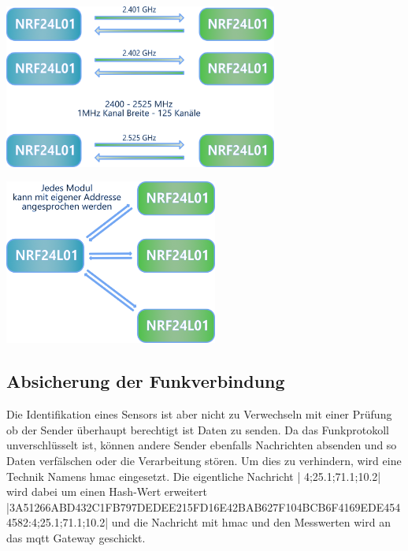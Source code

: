 \documentclass[
  12pt, %
  a4paper, %
  oneside, %
  openany, 
  numbers=noenddot, %
  BCOR=5mm, %
  parskip=half*, %
  thesis, %
]{bfhbook}
\begin{document}
\begin{center}
    \begin{minipage}[b]{0.45\textwidth}
        \centering
        \includegraphics[width=9cm]{Bilder/NRF24Kommunikation.png}
        \captionsetup{justification=centering}
    \end{minipage}\hfill
    \begin{minipage}[b]{0.45\textwidth}
        \centering
        \includegraphics[width=7cm]{Bilder/NRF24Kommunikation-2.png} %
        \captionsetup{justification=centering}
    \end{minipage}
\end{center}
\subsection{Absicherung der Funkverbindung}\label{funkAbsicherung}
Die Identifikation eines Sensors ist aber nicht zu Verwechseln mit einer Prüfung ob der Sender überhaupt berechtigt ist Daten zu senden. Da das Funkprotokoll unverschlüsselt ist, können andere Sender ebenfalls Nachrichten absenden und so Daten verfälschen oder die Verarbeitung stören. Um dies zu verhindern, wird eine Technik Namens \Gls{hmac} eingesetzt.
Die eigentliche Nachricht | 4;25.1;71.1;10.2| wird dabei um einen Hash-Wert erweitert
|3A51266ABD432C1FB797DEDEE215FD16E42BAB627F104BCB6F4169EDE4544582:4;25.1;71.1;10.2| und die Nachricht mit \Gls{hmac} und den Messwerten wird an das \Gls{mqtt} Gateway geschickt.
\end{document}
